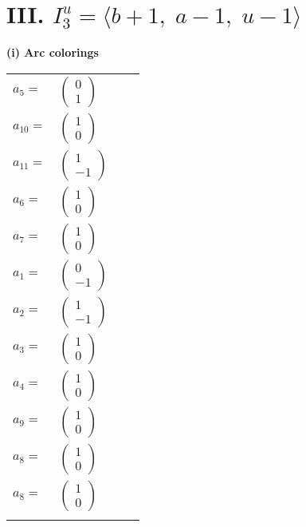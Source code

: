\documentclass[1p]{elsarticle_modified}
\theoremstyle{definition}
\begin{document}
\centering \section*{III. $I^u_{3}= \langle b+1,\;a-1,\;u-1 \rangle$}
\flushleft \textbf{(i) Arc colorings}\\
\begin{tabular}{m{7pt} m{180pt} m{7pt} m{180pt} }
\flushright $a_{5}=$&$\begin{pmatrix}0\\1\end{pmatrix}$ \\
\flushright $a_{10}=$&$\begin{pmatrix}1\\0\end{pmatrix}$ \\
\flushright $a_{11}=$&$\begin{pmatrix}1\\-1\end{pmatrix}$ \\
\flushright $a_{6}=$&$\begin{pmatrix}1\\0\end{pmatrix}$ \\
\flushright $a_{7}=$&$\begin{pmatrix}1\\0\end{pmatrix}$ \\
\flushright $a_{1}=$&$\begin{pmatrix}0\\-1\end{pmatrix}$ \\
\flushright $a_{2}=$&$\begin{pmatrix}1\\-1\end{pmatrix}$ \\
\flushright $a_{3}=$&$\begin{pmatrix}1\\0\end{pmatrix}$ \\
\flushright $a_{4}=$&$\begin{pmatrix}1\\0\end{pmatrix}$ \\
\flushright $a_{9}=$&$\begin{pmatrix}1\\0\end{pmatrix}$ \\
\flushright $a_{8}=$&$\begin{pmatrix}1\\0\end{pmatrix}$\\ \flushright $a_{8}=$&$\begin{pmatrix}1\\0\end{pmatrix}$\\&\end{tabular}
\end{document}
